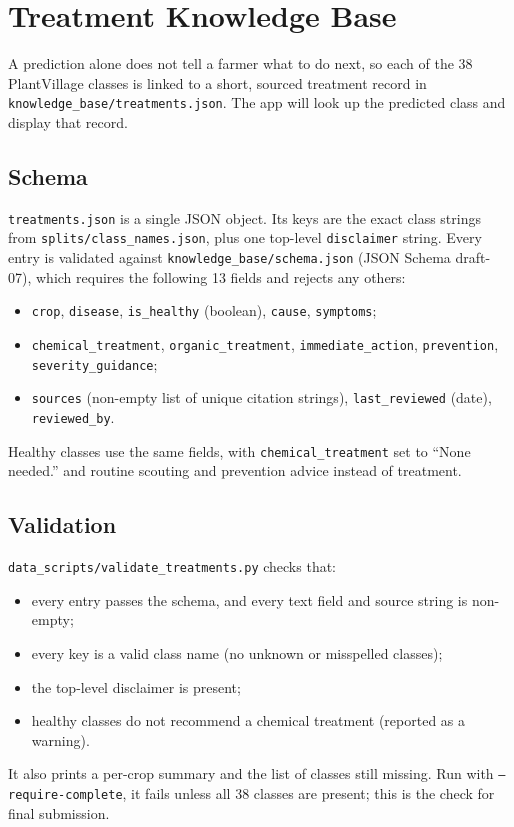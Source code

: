 \section{Treatment Knowledge Base}
\label{sec:kb}

A prediction alone does not tell a farmer what to do next, so each of the 38 PlantVillage classes is linked to a short, sourced treatment record in \texttt{knowledge\_base/treatments.json}. The app will look up the predicted class and display that record.

\subsection{Schema}
\texttt{treatments.json} is a single JSON object. Its keys are the exact class strings from \texttt{splits/class\_names.json}, plus one top-level \texttt{disclaimer} string. Every entry is validated against \texttt{knowledge\_base/schema.json} (JSON Schema draft-07), which requires the following 13 fields and rejects any others:
\begin{itemize}
    \item \texttt{crop}, \texttt{disease}, \texttt{is\_healthy} (boolean), \texttt{cause}, \texttt{symptoms};
    \item \texttt{chemical\_treatment}, \texttt{organic\_treatment}, \texttt{immediate\_action}, \texttt{prevention}, \texttt{severity\_guidance};
    \item \texttt{sources} (non-empty list of unique citation strings), \texttt{last\_reviewed} (date), \texttt{reviewed\_by}.
\end{itemize}
Healthy classes use the same fields, with \texttt{chemical\_treatment} set to ``None needed.'' and routine scouting and prevention advice instead of treatment.

\subsection{Validation}
\texttt{data\_scripts/validate\_treatments.py} checks that:
\begin{itemize}
    \item every entry passes the schema, and every text field and source string is non-empty;
    \item every key is a valid class name (no unknown or misspelled classes);
    \item the top-level disclaimer is present;
    \item healthy classes do not recommend a chemical treatment (reported as a warning).
\end{itemize}
It also prints a per-crop summary and the list of classes still missing. Run with \texttt{--require-complete}, it fails unless all 38 classes are present; this is the check for final submission.

